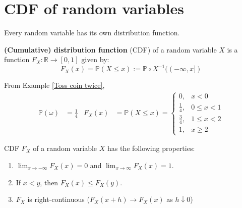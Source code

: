 \documentclass{huhtakm-template-book}
\newcommand{\prob}{\mathbb{P}}
\begin{document}
\section{CDF of random variables}
    Every random variable has its own distribution function.
    \begin{defn}
        \textbf{(Cumulative) distribution function} (CDF) of a random variable $X$ is a function $F_{X}:\mathbb{R}\to [0,1]$ given by:
        \begin{equation*}
            F_{X}(x)=\prob(X\leq x):=\prob\circ X^{-1}((-\infty,x])
        \end{equation*}
    \end{defn}
    \begin{eg}
        From Example \ref{Toss coin twice},
        \begin{align*}
            \prob(\omega)&=\frac{1}{4} & F_{X}(x)&=\prob(X\leq x)=\begin{cases}
                0, &x<0\\
                \frac{1}{4}, &0\leq x<1\\
                \frac{3}{4}, &1\leq x<2\\
                1, &x\geq 2
            \end{cases}
        \end{align*}
    \end{eg}
    \begin{lem}
        CDF $F_{X}$ of a random variable $X$ has the following properties:
        \begin{enumerate}
            \item $\lim_{x\to -\infty}F_{X}(x)=0$ and $\lim_{x\to\infty}F_{X}(x)=1$.
            \item If $x<y$, then $F_{X}(x)\leq F_{X}(y)$.
            \item $F_{X}$ is right-continuous ($F_{X}(x+h)\to F_{X}(x)$ as $h\downarrow 0$)
        \end{enumerate}
    \end{lem}
\end{document}

